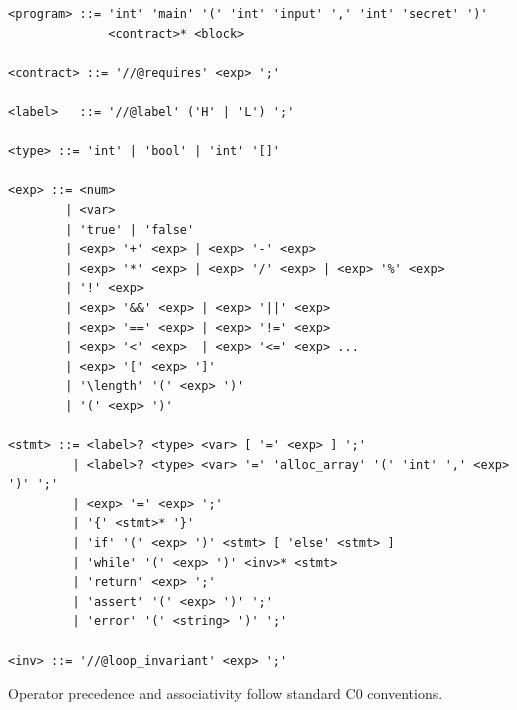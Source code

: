 \documentclass[11pt]{article}
\begin{document}
\begin{verbatim}
<program> ::= 'int' 'main' '(' 'int' 'input' ',' 'int' 'secret' ')'
              <contract>* <block>

<contract> ::= '//@requires' <exp> ';'

<label>   ::= '//@label' ('H' | 'L') ';'

<type> ::= 'int' | 'bool' | 'int' '[]'

<exp> ::= <num>
        | <var>
        | 'true' | 'false'
        | <exp> '+' <exp> | <exp> '-' <exp>
        | <exp> '*' <exp> | <exp> '/' <exp> | <exp> '%' <exp>
        | '!' <exp>
        | <exp> '&&' <exp> | <exp> '||' <exp>
        | <exp> '==' <exp> | <exp> '!=' <exp>
        | <exp> '<' <exp>  | <exp> '<=' <exp> ...
        | <exp> '[' <exp> ']'
        | '\length' '(' <exp> ')'
        | '(' <exp> ')'

<stmt> ::= <label>? <type> <var> [ '=' <exp> ] ';'
         | <label>? <type> <var> '=' 'alloc_array' '(' 'int' ',' <exp> ')' ';'
         | <exp> '=' <exp> ';'
         | '{' <stmt>* '}'
         | 'if' '(' <exp> ')' <stmt> [ 'else' <stmt> ]
         | 'while' '(' <exp> ')' <inv>* <stmt>
         | 'return' <exp> ';'
         | 'assert' '(' <exp> ')' ';'
         | 'error' '(' <string> ')' ';'

<inv> ::= '//@loop_invariant' <exp> ';'
\end{verbatim}

Operator precedence and associativity follow standard C0 conventions.
\end{document}

